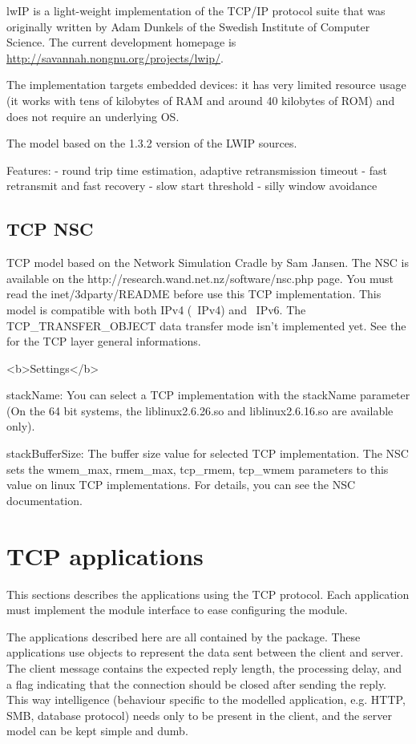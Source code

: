 lwIP is a light-weight implementation of the TCP/IP protocol suite
that was originally written by Adam Dunkels of the Swedish Institute of
Computer Science. The current development homepage is
\url{http://savannah.nongnu.org/projects/lwip/}.

The implementation targets embedded devices: it has
very limited resource usage (it works with tens of kilobytes of RAM and
around 40 kilobytes of ROM) and does not require an underlying OS.

The  model based on the 1.3.2 version of the LWIP sources.

Features:
- round trip time estimation, adaptive retransmission timeout
- fast retransmit and fast recovery
- slow start threshold
- silly window avoidance



\subsection{TCP NSC}

TCP model based on the Network Simulation Cradle by Sam Jansen.
The NSC is available on the http://research.wand.net.nz/software/nsc.php page.
You must read the inet/3dparty/README before use this TCP implementation.
This model is compatible with both IPv4 (~IPv4) and ~IPv6.
The TCP\_TRANSFER\_OBJECT data transfer mode isn't implemented yet.
See the  for the TCP layer general informations.

<b>Settings</b>

stackName: You can select a TCP implementation with the stackName parameter
(On the 64 bit systems, the liblinux2.6.26.so and liblinux2.6.16.so are available only).

stackBufferSize: The buffer size value for selected TCP implementation.
The NSC sets the wmem\_max, rmem\_max, tcp\_rmem, tcp\_wmem parameters to this value
on linux TCP implementations. For details, you can see the NSC documentation.


\section{TCP applications}

This sections describes the applications using the TCP protocol.
Each application must implement the  module interface
to ease configuring the  module.

The applications described here are all contained by the
 package. These applications use
 objects to represent the data sent between the client
and server. The client message contains the expected reply length, the
processing delay, and a flag indicating that the connection should be closed
after sending the reply. This way intelligence (behaviour specific to the
modelled application, e.g. HTTP, SMB, database protocol) needs only to be
present in the client, and the server model can be kept simple and dumb.


